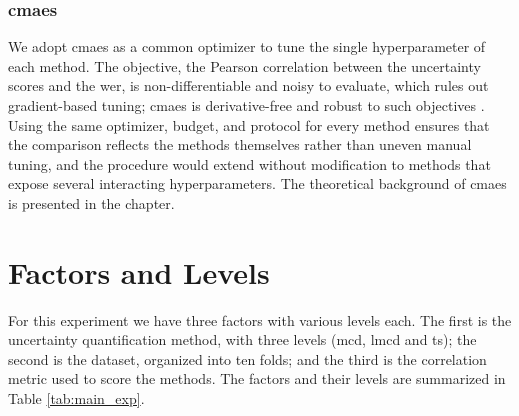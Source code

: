 \subsubsection{\acrlong{cmaes}}
We adopt \acrshort{cmaes} \cite{hansen2001completely} as a common optimizer to tune the single hyperparameter of each method. The objective, the Pearson correlation between the uncertainty scores and the \acrshort{wer}, is non-differentiable and noisy to evaluate, which rules out gradient-based tuning; \acrshort{cmaes} is derivative-free and robust to such objectives \cite{loshchilov2016cma}. Using the same optimizer, budget, and protocol for every method ensures that the comparison reflects the methods themselves rather than uneven manual tuning, and the procedure would extend without modification to methods that expose several interacting hyperparameters. The theoretical background of \acrshort{cmaes} is presented in the  chapter.



\section{Factors and Levels}

For this experiment we have three factors with various levels each. The first is the uncertainty quantification method, with three levels (\acrshort{mcd}, \acrshort{lmcd} and \acrshort{ts}); the second is the dataset, organized into ten folds; and the third is the correlation metric used to score the methods. The factors and their levels are summarized in Table \ref{tab:main_exp}.

